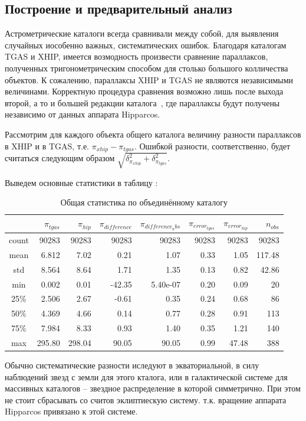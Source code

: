 \documentclass[14pt]{article} %
\begin{document}
\subsection{Построение и предварительный анализ}\label{errvid}

Астрометрические каталоги всегда сравнивали между собой, для выявления случайных иособенно важных, систематических ошибок. Благодаря каталогам TGAS и XHIP, имеется возмодность произвести сравнение параллаксов, полученных тригонометрическим способом для столько большого колличества объектов. К сожалению, параллаксы XHIP и TGAS  не являются независимыми величинами. Корректную процедура сравнения возможно лишь после выхода второй, а то и большей редакции каталога~\cite{wiki:gaia}, где параллаксы будут получены независимо от данных аппарата Hipparcos.

Рассмотрим для каждого объекта общего каталога величину разности параллаксов в XHIP и в TGAS, т.е. $\pi_{xhip} - \pi_{tgas}$. Ошибкой разности, соответственно, будет считаться следующим образом $\sqrt{\delta^2_{\pi_{xhip}} + \delta^2_{\pi_{tgas}}}$. 

Выведем основные статистики в таблицу :

\begin{table}[h!]
\centering
\caption{Общая статистика по объединённому каталогу}
\label{tabular:tgas_st}
\begin{tabular}{c|r|r|r|r|r|r|r}
\hline 	
&$\pi_{tgas}$&$\pi_{hip}$&$\pi_{difference}$&$\pi_{difference_abs}$&$\pi_{error_{tgas}}$&$\pi_{error_{hip}}$&$n_{obs}$\\
\hline 	
count&90283&90283&90283&90283&90283&90283&90283\\
\hline 
mean&6.812&7.02&0.21&1.07&0.33&1.05&117.48\\
std&8.564&8.64&1.71&1.35&0.13&0.82&42.86\\
min&0.002&0.01&-42.35&5.40e-07&0.20&0.09&20\\
25\%&2.506&2.67&-0.61&0.35&0.24&0.68&86\\
50\%&4.369&4.66&0.14&0.77&0.28&0.91&113\\
75\%&7.984&8.33&0.93&1.40&0.35&1.21&140\\
max&295.80&298.04&90.05&90.05&0.99&47.48&388\\
\end{tabular}
\end{table}

Обычно систематические разности иследуют в экваториальной, в силу наблюдений звезд с земли для этого кталога, или в галактической системе для массивных каталогов -- звездное распределение в которой симметрично. При этом не стоит сбрасывать со считов эклиптиескую систему. т.к. вращение аппарата Hipparcos привязано к этой системе.
\end{document}
